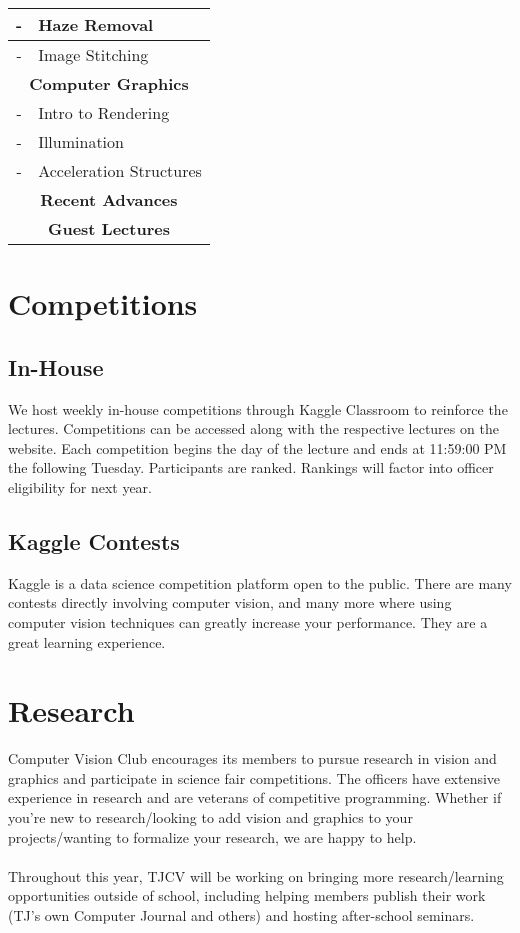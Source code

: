 \documentclass{article}
\begin{document}
\begin{table}[H]
\begin{tabular}{|c|l|}
-    & Haze Removal                                \\ \hline
-    & Image Stitching                             \\ \hline
\multicolumn{2}{|c|}{\textbf{Computer Graphics}}   \\ \hline
-    & Intro to Rendering                          \\ \hline
-    & Illumination                                \\ \hline
-    & Acceleration Structures                     \\ \hline
\multicolumn{2}{|c|}{\textbf{Recent Advances}}     \\ \hline
\multicolumn{2}{|c|}{\textbf{Guest Lectures}}      \\ \hline
\end{tabular}
\end{table}

\section{Competitions}
\subsection{In-House}
We host weekly in-house competitions through Kaggle Classroom to reinforce the lectures. Competitions can be accessed along with the respective lectures on the website. Each competition begins the day of the lecture and ends at 11:59:00 PM the following Tuesday. Participants are ranked. Rankings will factor into officer eligibility for next year.  

\subsection{Kaggle Contests}
Kaggle is a data science competition platform open to the public. There are many contests directly involving computer vision, and many more where using computer vision techniques can greatly increase your performance. They are a great learning experience.

\section{Research}
Computer Vision Club encourages its members to pursue research in vision and graphics and participate in science fair competitions. The officers have extensive experience in research and are veterans of competitive programming. Whether if you're new to research/looking to add vision and graphics to your projects/wanting to formalize your research, we are happy to help.
\\ \\
Throughout this year, TJCV will be working on bringing more research/learning opportunities outside of school, including helping members publish their work (TJ's own Computer Journal and others) and hosting after-school seminars. 
\end{document}
